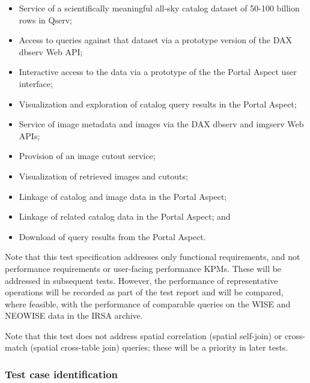 \begin{itemize}
\item{Service of a scientifically meaningful all-sky catalog dataset of 50-100 billion rows in Qserv;}
\item{Access to queries against that dataset via a prototype version of the DAX dbserv Web API;}
\item{Interactive access to the data via a prototype of the the Portal Aspect user interface;}
\item{Visualization and exploration of catalog query results in the Portal Aspect;}
\item{Service of image metadata and images via the DAX dbserv and imgserv Web APIs;}
\item{Provision of an image cutout service;}
\item{Visualization of retrieved images and cutouts;}
\item{Linkage of catalog and image data in the Portal Aspect;}
\item{Linkage of related catalog data in the Portal Aspect; and}
\item{Download of query results from the Portal Aspect.}
\end{itemize}

Note that this test specification addresses only functional requirements, and not performance requirements or user-facing performance KPMs.
These will be addressed in subsequent tests.
However, the performance of representative operations will be recorded as part of the test report and will be compared, where feasible, with the performance of comparable queries on the WISE and NEOWISE data in the IRSA archive.

Note that this test does not address spatial correlation (spatial self-join) or cross-match (spatial cross-table join) queries;
these will be a priority in later tests.

\subsubsection{Test case identification}

